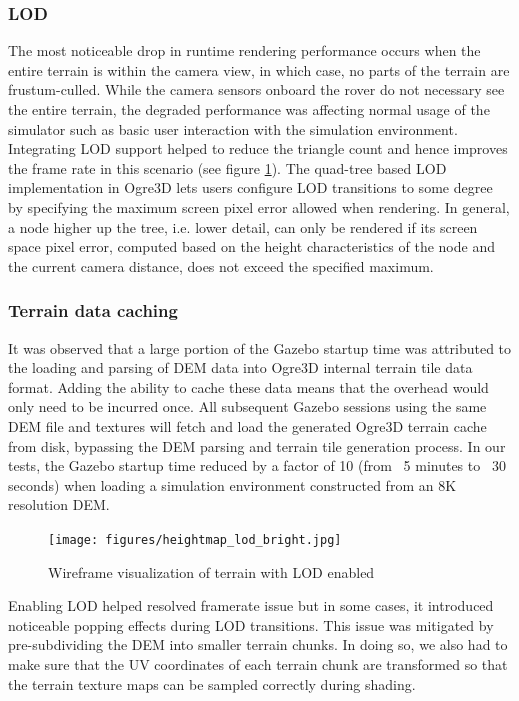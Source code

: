 \documentclass[twocolumn,letterpaper]{IEEEAerospaceCLS}  %
\begin{document}
\subsubsection{LOD}

The most noticeable drop in runtime rendering performance occurs when the entire terrain is within the camera view, in which case, no parts of the terrain are frustum-culled.  
While the camera sensors onboard the rover do not necessary see the entire terrain, the degraded performance was affecting normal usage of the simulator such as basic user interaction with the simulation environment.  
Integrating LOD support helped to reduce the triangle count and hence improves the frame rate in this scenario (see figure \ref{fig:heightmaplod}).  
The quad-tree based LOD implementation in Ogre3D lets users configure LOD transitions to some degree by specifying the maximum screen pixel error allowed when rendering.  
In general, a node higher up the tree, i.e.  lower detail, can only be rendered if its screen space pixel error, computed based on the height characteristics of the node and the current camera distance, does not exceed the specified maximum.  

\subsubsection{Terrain data caching}

It was observed that a large portion of the Gazebo startup time was attributed to the loading and parsing of DEM data into Ogre3D internal terrain tile data format.  
Adding the ability to cache these data means that the overhead would only need to be incurred once.  
All subsequent Gazebo sessions using the same DEM file and textures will fetch and load the generated Ogre3D terrain cache from disk, bypassing the DEM parsing and terrain tile generation process.  
In our tests, the Gazebo startup time reduced by a factor of 10 (from ~5 minutes to ~30 seconds) when loading a simulation environment constructed from an 8K resolution DEM.

\begin{figure}[h!]
	\texttt{[image: figures/heightmap\_lod\_bright.jpg]}
   	\caption{Wireframe visualization of terrain with LOD enabled}
    \label{fig:heightmaplod}
\end{figure}

Enabling LOD helped resolved framerate issue but in some cases, it introduced noticeable popping effects during LOD transitions.  
This issue was mitigated by pre-subdividing the DEM into smaller terrain chunks.  
In doing so, we also had to make sure that the UV coordinates of each terrain chunk are transformed so that the terrain texture maps can be sampled correctly during shading.
\end{document}
